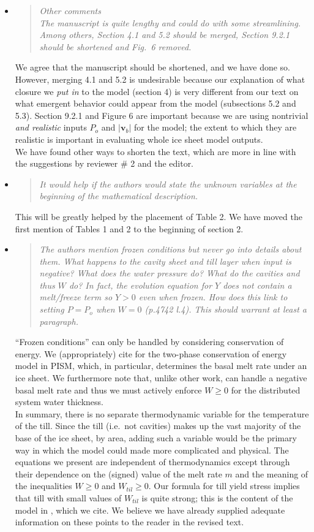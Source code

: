 \documentclass[11pt,reqno]{amsart}
\newcommand{\reply}[2]{
\medskip\medskip
\item  \begin{quote}
\emph{#1}
\end{quote}

\medskip
\noindent #2}
\begin{document}
\begin{itemize}
\reply{Other comments\\
The manuscript is quite lengthy and could do with some streamlining. Among others,
Section 4.1 and 5.2 should be merged, Section 9.2.1 should be shortened and Fig.~6
removed.}
{We agree that the manuscript should be shortened, and we have done so.  However, merging 4.1 and 5.2 is undesirable because our explanation of what closure we \emph{put in} to the model (section 4) is very different from our text on what emergent behavior could appear from the model (subsections 5.2 and 5.3).  Section 9.2.1 and Figure 6 are important because we are using nontrivial \emph{and realistic} inputs $P_o$ and $|\mathbf{v}_b|$ for the model; the extent to which they are realistic is important in evaluating whole ice sheet model outputs. \\
\indent We have found other ways to shorten the text, which are more in line with the suggestions by reviewer \# 2 and the editor.}

\reply{It would help if the authors would state the unknown variables at the beginning of the mathematical description.}
{This will be greatly helped by the placement of Table 2.  We have moved the first mention of Tables 1 and 2 to the beginning of section 2.}

\reply{The authors mention frozen conditions but never go into details about them.  What
happens to the cavity sheet and till layer when input is negative?  What does the water
pressure do?  What do the cavities and thus $W$ do?  In fact, the evolution equation for
$Y$ does not contain a melt/freeze term so $Y > 0$ even when frozen.  How does this link
to setting $P = P_o$ when $W = 0$ (p.4742 l.4).  This should warrant at least a paragraph.}
{``Frozen conditions'' can only be handled by considering conservation of energy.  We (appropriately) cite \cite{AschwandenBuelerKhroulevBlatter} for the two-phase conservation of energy model in PISM, which, in particular, determines the basal melt rate under an ice sheet.  We furthermore note that, unlike other work, can handle a negative basal melt rate and thus we must actively enforce $W\ge 0$ for the distributed system water thickness.  \\
\indent In summary, there is no separate thermodynamic variable for the temperature of the till.  Since the till (i.e.~not cavities) makes up the vast majority of the base of the ice sheet, by area, adding such a variable would be the primary way in which the model could made more complicated and physical.  The equations we present are independent of thermodynamics except through their dependence on the (signed) value of the melt rate $m$ and the meaning of the inequalities $W\ge 0$ and $W_{til}\ge 0$.  Our formula for till yield stress implies that till with small values of $W_{til}$ is quite strong; this is the content of the model in \cite{Tulaczyketal2000}, which we cite.  We believe we have already supplied adequate information on these points to the reader in the revised text.}


\end{itemize}
\end{document}
